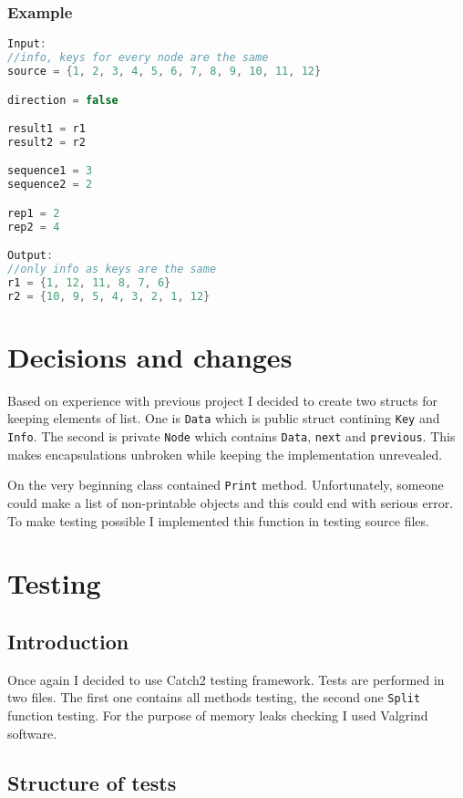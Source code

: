 \documentclass{article}
\begin{document}
\subsubsection*{Example}

\begin{lstlisting}[language=C++]
Input:
//info, keys for every node are the same
source = {1, 2, 3, 4, 5, 6, 7, 8, 9, 10, 11, 12}

direction = false

result1 = r1
result2 = r2

sequence1 = 3
sequence2 = 2

rep1 = 2
rep2 = 4

Output:
//only info as keys are the same
r1 = {1, 12, 11, 8, 7, 6}
r2 = {10, 9, 5, 4, 3, 2, 1, 12}
\end{lstlisting}
\vspace{\baselineskip}

\section{Decisions and changes}

Based on experience with previous project I decided to create two structs for keeping elements
of list. One is {\tt Data} which is public struct contining {\tt Key} and {\tt Info}.
The second is private {\tt Node} which contains {\tt Data}, {\tt next} and {\tt previous}.
This makes encapsulations unbroken while keeping the implementation unrevealed.

On the very beginning class contained {\tt Print} method. Unfortunately, someone could
make a list of non-printable objects and this could end with serious error. To make testing
possible I implemented this function in testing source files.

\section{Testing}

\subsection{Introduction}

Once again I decided to use Catch2 testing framework. Tests are performed in two files.
The first one contains all methods testing, the second one {\tt Split} function testing.
For the purpose of memory leaks checking I used Valgrind software.

\subsection{Structure of tests}
\end{document}
